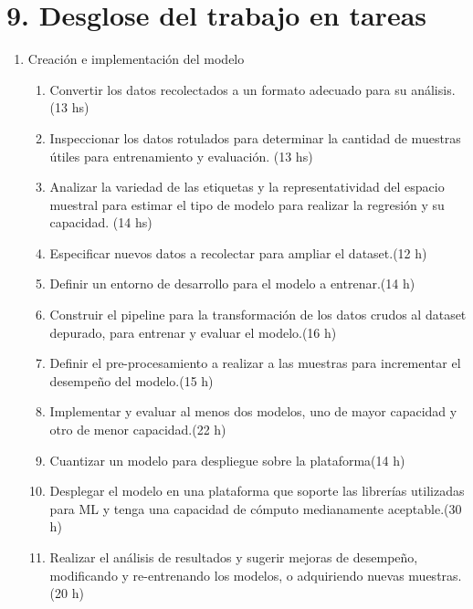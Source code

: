 \documentclass[
11pt, %
codirector, %
]{charter}
\begin{document}
\section{9. Desglose del trabajo en tareas}
\label{sec:wbs}


\begin{enumerate}
\item Creación e implementación del modelo
	\begin{enumerate}
	\item Convertir los datos recolectados a un formato adecuado para su análisis. (13 hs)
	\item Inspeccionar los datos rotulados para determinar la cantidad de muestras útiles para entrenamiento y evaluación. (13 hs)
	\item Analizar la variedad de las etiquetas y la representatividad del espacio muestral para estimar el tipo de modelo para realizar la regresión y su capacidad. (14 hs)
	\item Especificar nuevos datos a recolectar para ampliar el dataset.(12 h)
	\item Definir un entorno de desarrollo para el modelo a entrenar.(14 h)
	\item Construir el pipeline para la transformación de los datos crudos al dataset depurado, para entrenar y evaluar el modelo.(16 h)
	\item Definir el pre-procesamiento a realizar a las muestras para incrementar el desempeño del modelo.(15 h)
	\item Implementar y evaluar al menos dos modelos, uno de mayor capacidad y otro de menor capacidad.(22 h)
	\item Cuantizar un modelo para despliegue sobre la plataforma(14 h)
	\item Desplegar el modelo en una plataforma que soporte las librerías utilizadas para ML y tenga una capacidad de cómputo medianamente aceptable.(30 h)
	\item Realizar el análisis de resultados y sugerir mejoras de desempeño, modificando y re-entrenando los modelos, o adquiriendo nuevas muestras.(20 h)
		

\end{enumerate}
\end{enumerate}
\end{document}
